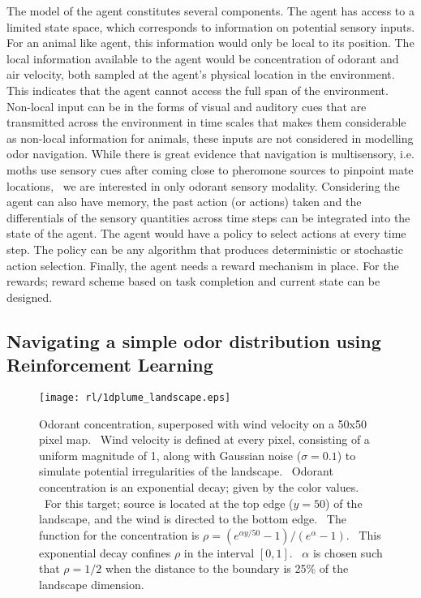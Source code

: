 \documentclass[../dissertation.tex]{subfiles}
\begin{document}
The model of the agent constitutes several components.
The agent has access to a limited state space, which corresponds to information on potential sensory inputs.
For an animal like agent, this information would only be local to its position.
The local information available to the agent would be concentration of odorant and air velocity, both sampled at the agent's physical location in the environment.
This indicates that the agent cannot access the full span of the environment.
Non-local input can be in the forms of visual and auditory cues that are transmitted across the environment in time scales that makes them considerable as non-local information for animals, these inputs are not considered in modelling odor navigation.
While there is great evidence that navigation is multisensory, i.e. moths use sensory cues after coming close to pheromone sources to pinpoint mate locations,~\cite{moth-multisensory} we are interested in only odorant sensory modality.
Considering the agent can also have memory, the past action (or actions) taken and the differentials of the sensory quantities across time steps can be integrated into the state of the agent.
The agent would have a policy to select actions at every time step.
The policy can be any algorithm that produces deterministic or stochastic action selection.
Finally, the agent needs a reward mechanism in place.
For the rewards; reward scheme based on task completion and current state can be designed.

\subsection{Navigating a simple odor distribution using Reinforcement Learning}

\begin{figure}[p]
    \centering
    \texttt{[image: rl/1dplume\_landscape.eps]}
    \caption[$Large source odorant dispersion$]{
        Odorant concentration, superposed with wind velocity on a 50x50 pixel map. \
        Wind velocity is defined at every pixel, consisting of a uniform magnitude of 1, along with Gaussian noise ($\sigma = 0.1$) to simulate potential irregularities of the landscape. \
        Odorant concentration is an exponential decay; given by the color values. \
        For this target; source is located at the top edge ($y=50$) of the landscape, and the wind is directed to the bottom edge. \
        The function for the concentration is $\rho = \left( e^{\alpha y / 50} - 1 \right) / \left( e^{\alpha} - 1 \right)$. \
        This exponential decay confines $\rho$ in the interval $\left[0,1\right]$. \
        $\alpha$ is chosen such that $\rho=1/2$ when the distance to the boundary is 25\% of the landscape dimension.}
    \label{fig:example1Dplume}
\end{figure}
\end{document}
